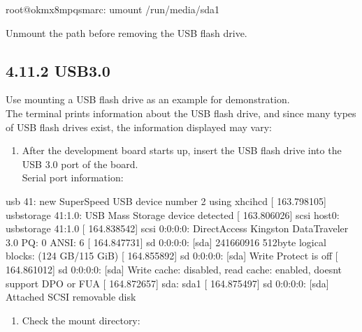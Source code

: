 \documentclass[letterpaper,10pt,openany,english]{sphinxmanual}
\begin{document}
\begin{sphinxVerbatim}[commandchars=\\\{\}]
root@ok\PYGZhy{}mx8mpq\PYGZhy{}smarc:\PYGZti{}\PYGZsh{} umount /run/media/sda1
\end{sphinxVerbatim}

\sphinxAtStartPar
Unmount the path before removing the USB flash drive.


\subsection{4.11.2 USB3.0}
\label{\detokenize{linux-manual:usb3-0}}
\sphinxAtStartPar
Use mounting a USB flash drive as an example for demonstration.\\
The terminal prints information about the USB flash drive, and since many types of USB flash drives exist, the information displayed may vary:
\begin{enumerate}
%
\item {} 
\sphinxAtStartPar
After the development board starts up, insert the USB flash drive into the USB 3.0 port of the board.\\
Serial port information:

\end{enumerate}

\begin{sphinxVerbatim}[commandchars=\\\{\}]
[  163.749673] usb 4\PYGZhy{}1: new SuperSpeed USB device number 2 using xhci\PYGZhy{}hcd
[  163.798105] usb\PYGZhy{}storage 4\PYGZhy{}1:1.0: USB Mass Storage device detected
[  163.806026] scsi host0: usb\PYGZhy{}storage 4\PYGZhy{}1:1.0
[  164.838542] scsi 0:0:0:0: Direct\PYGZhy{}Access     Kingston DataTraveler 3.0      PQ: 0 ANSI: 6
[  164.847731] sd 0:0:0:0: [sda] 241660916 512\PYGZhy{}byte logical blocks: (124 GB/115 GiB)
[  164.855892] sd 0:0:0:0: [sda] Write Protect is off
[  164.861012] sd 0:0:0:0: [sda] Write cache: disabled, read cache: enabled, doesn\PYGZsq{}t support DPO or FUA
[  164.872657]  sda: sda1
[  164.875497] sd 0:0:0:0: [sda] Attached SCSI removable disk
\end{sphinxVerbatim}
\begin{enumerate}
%
\setcounter{enumi}{1}
\item {} 
\sphinxAtStartPar
Check the mount directory:

\end{enumerate}
\end{document}
